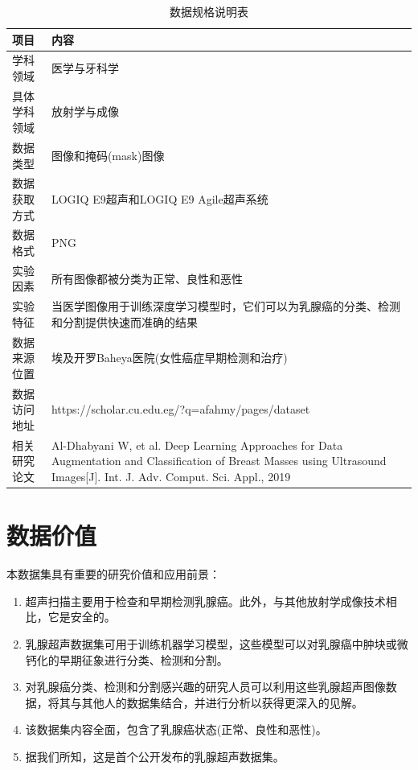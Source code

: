 \documentclass[supercite]{../Hust-undergraduate-translation/Experimental_Report}
\theoremstyle{definition}
\begin{document}
\begin{table}[htbp]
\centering
\caption{数据规格说明表}
\label{tbl:data_specification}
\begin{tabular}{|l|p{9cm}|}
\hline
项目 & 内容 \\
\hline
学科领域 & 医学与牙科学 \\
\hline
具体学科领域 & 放射学与成像 \\
\hline
数据类型 & 图像和掩码(mask)图像 \\
\hline
数据获取方式 & LOGIQ E9超声和LOGIQ E9 Agile超声系统 \\
\hline
数据格式 & PNG \\
\hline
实验因素 & 所有图像都被分类为正常、良性和恶性 \\
\hline
实验特征 & 当医学图像用于训练深度学习模型时，它们可以为乳腺癌的分类、检测和分割提供快速而准确的结果 \\
\hline
数据来源位置 & 埃及开罗Baheya医院(女性癌症早期检测和治疗) \\
\hline
数据访问地址 & https://scholar.cu.edu.eg/?q=afahmy/pages/dataset \\
\hline
相关研究论文 & Al-Dhabyani W, et al. Deep Learning Approaches for Data Augmentation and Classification of Breast Masses using Ultrasound Images[J]. Int. J. Adv. Comput. Sci. Appl., 2019 \\
\hline
\end{tabular}
\end{table}

\section{数据价值}

本数据集具有重要的研究价值和应用前景：

\begin{enumerate}
\item 超声扫描主要用于检查和早期检测乳腺癌。此外，与其他放射学成像技术相比，它是安全的。

\item 乳腺超声数据集可用于训练机器学习模型，这些模型可以对乳腺癌中肿块或微钙化的早期征象进行分类、检测和分割。

\item 对乳腺癌分类、检测和分割感兴趣的研究人员可以利用这些乳腺超声图像数据，将其与其他人的数据集结合，并进行分析以获得更深入的见解。

\item 该数据集内容全面，包含了乳腺癌状态(正常、良性和恶性)。

\item 据我们所知，这是首个公开发布的乳腺超声数据集。
\end{enumerate}
\end{document}
